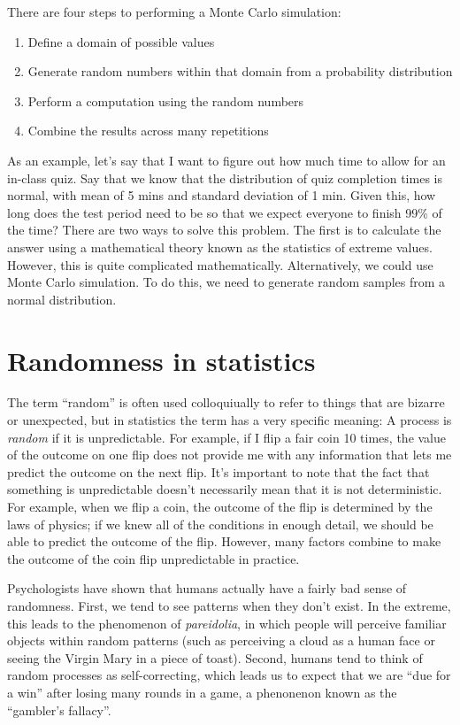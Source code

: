 \documentclass[]{book}
\providecommand{\tightlist}{%
  \setlength{\itemsep}{0pt}\setlength{\parskip}{0pt}}
\theoremstyle{definition}
\theoremstyle{definition}
\theoremstyle{definition}
\theoremstyle{remark}
\begin{document}
There are four steps to performing a Monte Carlo simulation:

\begin{enumerate}
\def\labelenumi{\arabic{enumi}.}
\tightlist
\item
  Define a domain of possible values
\item
  Generate random numbers within that domain from a probability
  distribution
\item
  Perform a computation using the random numbers
\item
  Combine the results across many repetitions
\end{enumerate}

As an example, let's say that I want to figure out how much time to
allow for an in-class quiz. Say that we know that the distribution of
quiz completion times is normal, with mean of 5 mins and standard
deviation of 1 min. Given this, how long does the test period need to be
so that we expect everyone to finish 99\% of the time? There are two
ways to solve this problem. The first is to calculate the answer using a
mathematical theory known as the statistics of extreme values. However,
this is quite complicated mathematically. Alternatively, we could use
Monte Carlo simulation. To do this, we need to generate random samples
from a normal distribution.

\section{Randomness in statistics}\label{randomness-in-statistics}

The term ``random'' is often used colloquiually to refer to things that
are bizarre or unexpected, but in statistics the term has a very
specific meaning: A process is \emph{random} if it is unpredictable. For
example, if I flip a fair coin 10 times, the value of the outcome on one
flip does not provide me with any information that lets me predict the
outcome on the next flip. It's important to note that the fact that
something is unpredictable doesn't necessarily mean that it is not
deterministic. For example, when we flip a coin, the outcome of the flip
is determined by the laws of physics; if we knew all of the conditions
in enough detail, we should be able to predict the outcome of the flip.
However, many factors combine to make the outcome of the coin flip
unpredictable in practice.

Psychologists have shown that humans actually have a fairly bad sense of
randomness. First, we tend to see patterns when they don't exist. In the
extreme, this leads to the phenomenon of \emph{pareidolia}, in which
people will perceive familiar objects within random patterns (such as
perceiving a cloud as a human face or seeing the Virgin Mary in a piece
of toast). Second, humans tend to think of random processes as
self-correcting, which leads us to expect that we are ``due for a win''
after losing many rounds in a game, a phenonenon known as the
``gambler's fallacy''.
\end{document}

